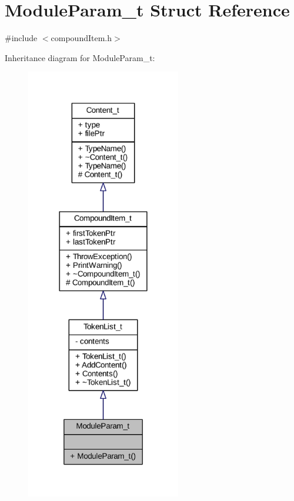 \hypertarget{struct_module_param__t}{}\section{Module\+Param\+\_\+t Struct Reference}
\label{struct_module_param__t}


{\ttfamily \#include $<$compound\+Item.\+h$>$}



Inheritance diagram for Module\+Param\+\_\+t\+:
\nopagebreak
\begin{figure}[H]
\begin{center}
\leavevmode
\includegraphics[width=191pt]{struct_module_param__t__inherit__graph}
\end{center}
\end{figure}


